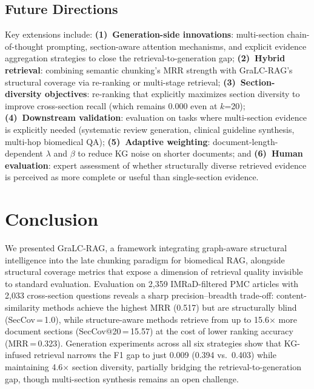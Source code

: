 \documentclass[sn-basic]{sn-jnl}
\newcommand{\gralcrag}{GraLC-RAG}
\begin{document}
\subsection{Future Directions}

Key extensions include: \textbf{(1)~Generation-side innovations}: multi-section chain-of-thought prompting, section-aware attention mechanisms, and explicit evidence aggregation strategies to close the retrieval-to-generation gap; \textbf{(2)~Hybrid retrieval}: combining semantic chunking's MRR strength with \gralcrag{}'s structural coverage via re-ranking or multi-stage retrieval; \textbf{(3)~Section-diversity objectives}: re-ranking that explicitly maximizes section diversity to improve cross-section recall (which remains 0.000 even at $k$=20); \textbf{(4)~Downstream validation}: evaluation on tasks where multi-section evidence is explicitly needed (systematic review generation, clinical guideline synthesis, multi-hop biomedical QA); \textbf{(5)~Adaptive weighting}: document-length-dependent $\lambda$ and $\beta$ to reduce KG noise on shorter documents; and \textbf{(6)~Human evaluation}: expert assessment of whether structurally diverse retrieved evidence is perceived as more complete or useful than single-section evidence.

\section{Conclusion}\label{sec:conclusion}

We presented \gralcrag{}, a framework integrating graph-aware structural intelligence into the late chunking paradigm for biomedical RAG, alongside structural coverage metrics that expose a dimension of retrieval quality invisible to standard evaluation. Evaluation on 2{,}359 IMRaD-filtered PMC articles with 2{,}033 cross-section questions reveals a sharp precision--breadth trade-off: content-similarity methods achieve the highest MRR (0.517) but are structurally blind (SecCov\,=\,1.0), while structure-aware methods retrieve from up to 15.6$\times$ more document sections (SecCov@20\,=\,15.57) at the cost of lower ranking accuracy (MRR\,=\,0.323). Generation experiments across all six strategies show that KG-infused retrieval narrows the F1 gap to just 0.009 (0.394 vs.\ 0.403) while maintaining 4.6$\times$ section diversity, partially bridging the retrieval-to-generation gap, though multi-section synthesis remains an open challenge.
\end{document}
